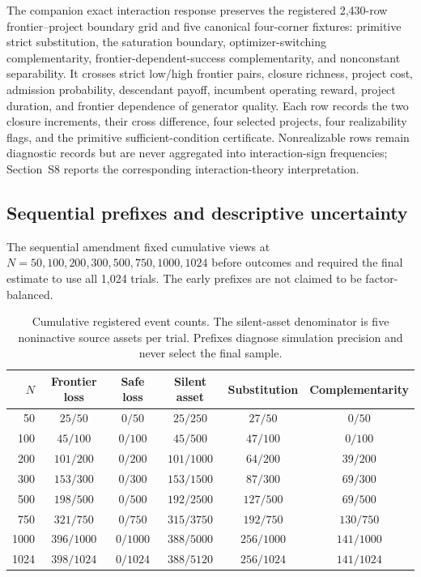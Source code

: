 The companion exact interaction response preserves the registered 2,430-row
frontier--project boundary grid and five canonical four-corner fixtures:
primitive strict substitution, the saturation boundary, optimizer-switching
complementarity, frontier-dependent-success complementarity, and nonconstant
separability.  It crosses strict low/high frontier pairs, closure richness,
project cost, admission probability, descendant payoff, incumbent operating
reward, project duration, and frontier dependence of generator quality.  Each
row records the two closure increments, their cross difference, four selected
projects, four realizability flags, and the primitive sufficient-condition
certificate.  Nonrealizable rows remain diagnostic records but are never
aggregated into interaction-sign frequencies; Section~S8 reports the
corresponding interaction-theory interpretation.

\subsection{Sequential prefixes and descriptive uncertainty}

The sequential amendment fixed cumulative views at
\(N=50,100,200,300,500,750,1000,1024\) before outcomes and required the final
estimate to use all 1,024 trials.  The early prefixes are not claimed to be
factor-balanced.

\begin{table}[htbp]
\centering
\scriptsize
\setlength{\tabcolsep}{3pt}
\begin{tabular}{@{}rccccc@{}}
\toprule
\(N\) & Frontier loss & Safe loss & Silent asset &
Substitution & Complementarity\\
\midrule
50   & \(25/50\)   & \(0/50\)   & \(25/250\)   & \(27/50\)    & \(0/50\)\\
100  & \(45/100\)  & \(0/100\)  & \(45/500\)   & \(47/100\)   & \(0/100\)\\
200  & \(101/200\) & \(0/200\)  & \(101/1000\) & \(64/200\)   & \(39/200\)\\
300  & \(153/300\) & \(0/300\)  & \(153/1500\) & \(87/300\)   & \(69/300\)\\
500  & \(198/500\) & \(0/500\)  & \(192/2500\) & \(127/500\)  & \(69/500\)\\
750  & \(321/750\) & \(0/750\)  & \(315/3750\) & \(192/750\)  & \(130/750\)\\
1000 & \(396/1000\)& \(0/1000\) & \(388/5000\) & \(256/1000\) & \(141/1000\)\\
1024 & \(398/1024\)& \(0/1024\) & \(388/5120\) & \(256/1024\) & \(141/1024\)\\
\bottomrule
\end{tabular}
\caption{Cumulative registered event counts.  The silent-asset denominator is
five noninactive source assets per trial.  Prefixes diagnose simulation
precision and never select the final sample.}
\label{tab:supp-randomized-v2-stability-events}
\end{table}


